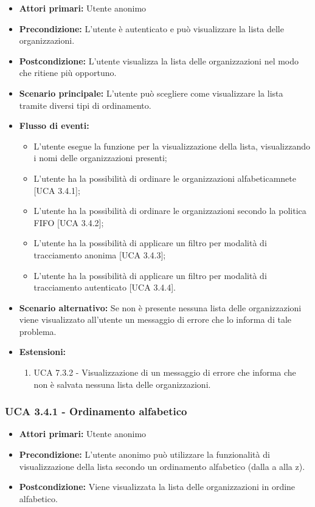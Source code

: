 \begin{itemize} 
	\item \textbf{Attori primari:} Utente anonimo
	\item \textbf{Precondizione:}  L'utente è autenticato e può visualizzare la lista delle organizzazioni.
	\item \textbf{Postcondizione:} L'utente visualizza la lista delle organizzazioni nel modo che ritiene più opportuno.
	\item \textbf{Scenario principale:}	L'utente può scegliere come visualizzare la lista tramite diversi tipi di ordinamento.
	\item \textbf{Flusso di eventi:}
	\begin{itemize}
		\item L'utente esegue la funzione per la visualizzazione della lista, visualizzando i nomi delle organizzazioni presenti;
		\item L'utente ha la possibilità di ordinare le organizzazioni alfabeticamnete [UCA 3.4.1];
		\item L'utente ha la possibilità di ordinare le organizzazioni secondo la politica FIFO [UCA 3.4.2];
		\item L'utente ha la possibilità di applicare un filtro per modalità di tracciamento anonima [UCA 3.4.3];
		\item L'utente ha la possibilità di applicare un filtro per modalità di tracciamento autenticato [UCA 3.4.4].
	\end{itemize}
	\item \textbf{Scenario alternativo:} Se non è presente nessuna lista delle organizzazioni viene visualizzato all'utente un messaggio di errore che lo informa di tale problema.
	\item \textbf{Estensioni:}
	\begin{enumerate}
		\item UCA 7.3.2 - Visualizzazione di un messaggio di errore che informa che non è salvata nessuna lista delle organizzazioni.
	\end{enumerate}
\end{itemize}

\subsubsection{UCA 3.4.1 - Ordinamento alfabetico}%
\begin{itemize}
	\item \textbf{Attori primari:} Utente anonimo
	\item \textbf{Precondizione:} L'utente anonimo può utilizzare la funzionalità di visualizzazione della lista secondo un ordinamento alfabetico (dalla a alla z).
	\item \textbf{Postcondizione:} Viene visualizzata la lista delle organizzazioni in ordine alfabetico.
\end{itemize}

